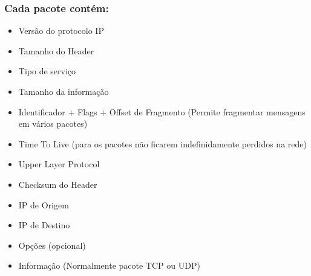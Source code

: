 \documentclass{article}
\begin{document}
\subsubsection{Cada pacote contém:}
\begin{itemize}
    \item Versão do protocolo IP
	\item Tamanho do Header
	\item Tipo de serviço
	\item Tamanho da informação
	\item Identificador + Flags + Offset de Fragmento (Permite fragmentar mensagens em vários pacotes)
	\item Time To Live (para os pacotes não ficarem indefinidamente perdidos na rede)
	\item Upper Layer Protocol
	\item Checksum do Header
	\item IP de Origem
	\item IP de Destino
	\item Opções (opcional)
	\item Informação (Normalmente pacote TCP ou UDP)
\end{itemize}
\end{document}
